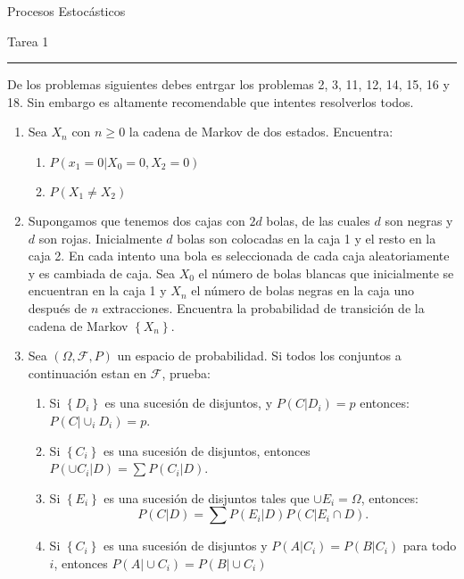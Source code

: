 \documentclass{report}
\begin{document}
\begin{center}
    \textsf{\Large Procesos Estocásticos}
    \par\medskip
    \textsf{\large Tarea 1}
\end{center}
\hrule
\par\bigskip
De los problemas siguientes debes entrgar los problemas 2, 3, 11, 12, 14, 15, 16 y 18. Sin embargo es altamente recomendable que intentes resolverlos todos.
\begin{enumerate}
    \item Sea $X_n$ con $n\geq 0$ la cadena de Markov de dos estados. Encuentra:
          \begin{enumerate}
              \item $P\left(\left. x_1=0\right\vert X_0=0, X_2=0\right)$
              \item $P\left(X_1\neq X_2\right)$
          \end{enumerate}
    \item Supongamos que tenemos dos cajas con $2d$ bolas, de las cuales $d$ son negras y $d$ son rojas. Inicialmente $d$ bolas son colocadas en la caja 1 y el resto en la caja 2. En cada intento una bola es seleccionada de cada caja aleatoriamente y es cambiada de caja. Sea $X_0$ el número de bolas blancas que inicialmente se encuentran en la caja 1 y $X_n$ el número de bolas negras en la caja uno después de $n$ extracciones. Encuentra la probabilidad de transición de la cadena de Markov $\left\{X_n\right\}$.
    \item Sea $\left(\Omega, \mathcal{F}, P\right)$ un espacio de probabilidad. Si todos los conjuntos a continuación estan en $\mathcal{F}$, prueba:
          \begin{enumerate}
              \item Si $\left\{D_i\right\}$ es una sucesión de disjuntos, y $P(\left.C\right\vert D_i)=p$ entonces: $P\left(\left. C \right\vert \cup_i D_i\right)=p$.
              \item Si $\left\{C_i\right\}$ es una sucesión de disjuntos, entonces $P\left(\left.\cup C_i\right\vert D\right)= \sum P\left(\left.C_i\right\vert D\right)$.
              \item Si $\left\{E_i\right\}$ es una sucesión de disjuntos tales que $\cup E_i = \Omega$, entonces:
                    $$
                        P\left(\left.C\right\vert D \right)= \sum P\left(\left.E_i\right\vert D\right)P\left(\left. C\right\vert E_i\cap D\right).
                    $$
              \item Si $\left\{C_i\right\}$ es una sucesión de disjuntos y $P\left(\left. A\right\vert C_i\right) = P\left(\left. B\right\vert C_i\right)$ para todo $i$, entonces $P\left(\left. A\right\vert \cup C_i\right) = P\left(\left. B\right\vert \cup C_i\right)$

\end{enumerate}
\end{enumerate}
\end{document}
